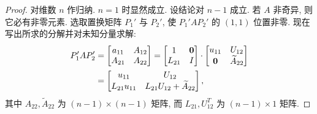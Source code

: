 \begin{proof}
对维数 $n$ 作归纳. $n=1$ 时显然成立. 设结论对 $n-1$ 成立. 若 $A$ 非奇异, 则它必有非零元素. 选取置换矩阵 $P_1'$ 与 $P_2'$, 使 $P_1'AP_2'$ 的 $(1,1)$ 位置非零. 现在写出所求的分解并对未知分量求解:
\begin{align}
  P_1'AP_2'
  &=
  \begin{bmatrix}
    a_{11} & A_{12}\\
    A_{21} & A_{22}
  \end{bmatrix}
  =
  \begin{bmatrix}
    1      & \mathbf{0}\\
    L_{21} & I
  \end{bmatrix}\cdot
  \begin{bmatrix}
    u_{11} & U_{12}\\
    \mathbf{0} & \widetilde{A}_{22}
  \end{bmatrix}\notag\\
  &=
  \begin{bmatrix}
    u_{11} & U_{12}\\
    L_{21}u_{11} & L_{21}U_{12}+\widetilde{A}_{22}
  \end{bmatrix},
  \label{eq:2-5}
\end{align}
其中 $A_{22},\widetilde{A}_{22}$ 为 $(n-1)\times(n-1)$ 矩阵, 而 $L_{21},U_{12}^T$ 为 $(n-1)\times1$ 矩阵.


\end{proof}
